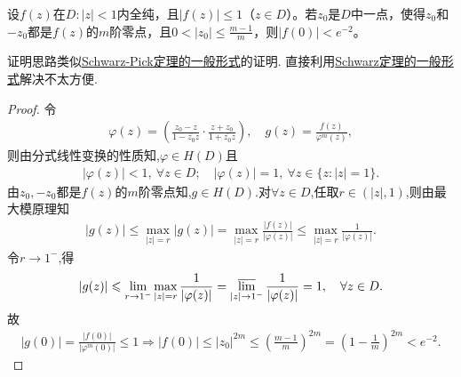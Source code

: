 \documentclass[../../main.tex]{subfiles}%
\begin{document}
\begin{example}
设$f(z)$在$D: |z|<1$内全纯，且$|f(z)|\leqslant 1$（$z\in D$）。若$z_0$是$D$中一点，使得$z_0$和$-z_0$都是$f(z)$的$m$阶零点，且$0<|z_0|\leqslant \frac{m-1}{m}$，则$|f(0)|<e^{-2}$。
\end{example}
\begin{note}
证明思路类似\hyperref[theorem:Schwarz-Pick定理的一般形式]{Schwarz-Pick定理的一般形式}的证明.
直接利用\hyperref[theorem:Schwarz定理的一般形式]{Schwarz定理的一般形式}解决不太方便.
\end{note}
\begin{proof}
令
\begin{align*}
\varphi(z)=\left(\frac{z_0-z}{1-\overline{z_0}z}\cdot\frac{z+z_0}{1+\overline{z_0}z}\right),\quad g(z)=\frac{f(z)}{\varphi^m(z)},
\end{align*}
则由分式线性变换的性质知,$\varphi\in H(D)$且
\begin{align*}
|\varphi(z)|<1,\ \forall z\in D;\quad |\varphi(z)|=1,\ \forall z\in\{z:|z|=1\}.
\end{align*}
由$z_0,-z_0$都是$f(z)$的$m$阶零点知,$g\in H(D)$.对$\forall z\in D$,任取$r\in(|z|,1)$,则由最大模原理知
\begin{align*}
|g(z)|\leqslant\max\limits_{|z|=r}|g(z)|=\max\limits_{|z|=r}\frac{|f(z)|}{|\varphi(z)|}\leqslant\max\limits_{|z|=r}\frac{1}{|\varphi(z)|}.
\end{align*}
令$r\rightarrow1^-$,得
\begin{align*}
|g(z)|\leqslant\lim\limits_{r\rightarrow1^-}\max\limits_{|z|=r}\frac{1}{|\varphi(z)|}=\varlimsup\limits_{|z|\rightarrow1^-}\frac{1}{|\varphi(z)|}=1,\quad \forall z\in D.
\end{align*}
故
\begin{align*}
\left| g\left( 0 \right) \right|=\frac{\left| f\left( 0 \right) \right|}{\left| \varphi ^m\left( 0 \right) \right|}\leqslant 1\Longrightarrow \left| f\left( 0 \right) \right|\leqslant \left| z_0 \right|^{2m}\leqslant \left( \frac{m-1}{m} \right) ^{2m}=\left( 1-\frac{1}{m} \right) ^{2m}<e^{-2}.
\end{align*}
\end{proof}
\end{document}
